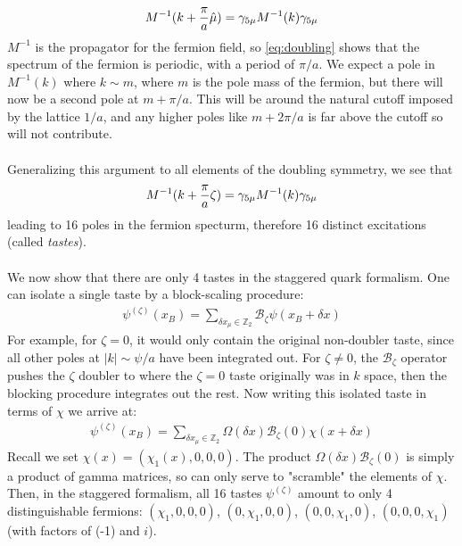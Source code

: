 \documentclass[a4paper,10pt]{article}
\numberwithin{equation}{section}
\begin{document}
\begin{align}
	M^{-1}(k+{\pi\over a}\hat{\mu}) = \gamma_{5\mu} M^{-1}(k) \gamma_{5\mu}
	\label{eq:doubling}
\end{align}
$M^{-1}$ is the propagator for the fermion field, so \ref{eq:doubling} shows that the spectrum of the fermion is periodic, with a period of $\pi/a$. We expect a pole in $M^{-1}(k)$ where $k \sim m$, where $m$ is the pole mass of the fermion, but there will now be a second pole at $m + \pi/a$. This will be around the natural cutoff imposed by the lattice $1/a$, and any higher poles like $m+2\pi/a$ is far above the cutoff so will not contribute.  
\\ \\
Generalizing this argument to all elements of the doubling symmetry, we see that
\begin{align}
	M^{-1}(k+{\pi\over a}\zeta) = \gamma_{5\mu} M^{-1}(k) \gamma_{5\mu}
\end{align}
leading to 16 poles in the fermion specturm, therefore 16 distinct excitations (called \textit{tastes}).
\\ \\
We now show that there are only 4 tastes in the staggered quark formalism. 
One can isolate a single taste by a block-scaling procedure:
\begin{align}
	\psi^{(\zeta)}(x_B) = \sum_{\delta x_{\mu} \in \mathbb{Z}_2} \mathcal{B}_{\zeta} \psi(x_B + \delta x)
\end{align}
For example, for $\zeta = 0$, it would only contain the original non-doubler taste, since all other poles at $|k|\sim\psi/a$ have been integrated out. For $\zeta \neq 0$, the $\mathcal{B}_{\zeta}$ operator pushes the $\zeta$ doubler to where the $\zeta=0$ taste originally was in $k$ space, then the blocking procedure integrates out the rest. Now writing this isolated taste in terms of $\chi$ we arrive at:
\begin{align}
	\psi^{(\zeta)}(x_B) = \sum_{\delta x_{\mu} \in \mathbb{Z}_2} \Omega(\delta x) \mathcal{B}_{\zeta}(0) \chi(x+\delta x)
\end{align} 
Recall we set $\chi(x) = (\chi_1(x),0,0,0)$. The product $\Omega(\delta x) \mathcal{B}_{\zeta}(0)$ is simply a product of gamma matrices, so can only serve to "scramble" the elements of $\chi$. Then, in the staggered formalism, all 16 tastes $\psi^{(\zeta)}$ amount to only 4 distinguishable fermions: $(\chi_1,0,0,0)$, $(0,\chi_1,0,0)$, $(0,0,\chi_1,0)$, $(0,0,0,\chi_1)$ (with factors of (-1) and $i$).
\end{document}
